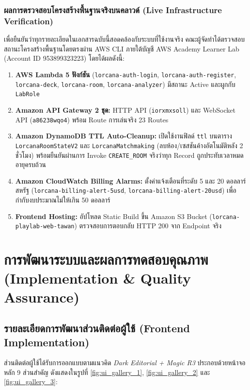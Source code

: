 \documentclass[12pt,a4paper]{report}
\begin{document}
\subsection{ผลการตรวจสอบโครงสร้างพื้นฐานจริงบนคลาวด์ (Live Infrastructure Verification)}
เพื่อยืนยันว่าทุกรายละเอียดในเอกสารฉบับนี้สอดคล้องกับระบบที่ใช้งานจริง คณะผู้จัดทำได้ตรวจสอบสถานะโครงสร้างพื้นฐานโดยตรงผ่าน AWS CLI ภายใต้บัญชี AWS Academy Learner Lab (Account ID 953899323223) โดยได้ผลดังนี้:
\begin{enumerate}
    \item \textbf{AWS Lambda 5 ฟังก์ชัน} (\texttt{lorcana-auth-login}, \texttt{lorcana-auth-register}, \texttt{lorcana-deck}, \texttt{lorcana-room}, \texttt{lorcana-analyzer}) มีสถานะ Active และผูกกับ \texttt{LabRole}
    \item \textbf{Amazon API Gateway 2 ชุด:} HTTP API (\texttt{iorxmxsoll}) และ WebSocket API (\texttt{a86238wqo4}) พร้อม Route การเล่นจริง 23 Routes
    \item \textbf{Amazon DynamoDB TTL Auto-Cleanup:} เปิดใช้งานฟิลด์ \texttt{ttl} บนตาราง \texttt{LorcanaRoomStateV2} และ \texttt{LorcanaMatchmaking} (ลบห้อง/เซสชันค้างอัตโนมัติหลัง 2 ชั่วโมง) พร้อมยืนยันผ่านการ Invoke \texttt{CREATE\_ROOM} จริงว่าทุก Record ถูกประทับเวลาหมดอายุครบถ้วน
    \item \textbf{Amazon CloudWatch Billing Alarms:} ตั้งค่าแจ้งเตือนที่ระดับ 5 และ 20 ดอลลาร์สหรัฐ (\texttt{lorcana-billing-alert-5usd}, \texttt{lorcana-billing-alert-20usd}) เพื่อกำกับงบประมาณไม่ให้เกิน 50 ดอลลาร์
    \item \textbf{Frontend Hosting:} อัปโหลด Static Build ขึ้น Amazon S3 Bucket (\texttt{lorcana-playlab-web-tawan}) ตรวจสอบการตอบกลับ HTTP 200 จาก Endpoint จริง
\end{enumerate}

\chapter{การพัฒนาระบบและผลการทดสอบคุณภาพ (Implementation \& Quality Assurance)}

\section{รายละเอียดการพัฒนาส่วนติดต่อผู้ใช้ (Frontend Implementation)}
ส่วนติดต่อผู้ใช้ได้รับการออกแบบตามแนวคิด \textit{Dark Editorial + Magic R3} ประกอบด้วยหน้าจอหลัก 9 ส่วนสำคัญ ดังแสดงในรูปที่ \ref{fig:ui_gallery_1}, \ref{fig:ui_gallery_2} และ \ref{fig:ui_gallery_3}:
\end{document}

